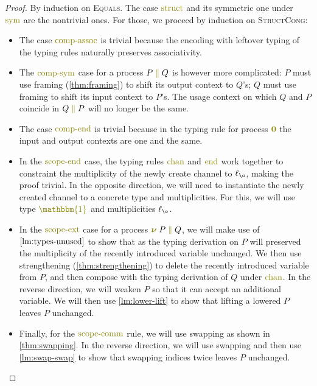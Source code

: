 \documentclass[a4paper,UKenglish,cleveref, autoref, thm-restate,authorcolumns]{lipics-v2019}
\theoremstyle{definition}
\newcommand{\constr}[1]{\textcolor{olive}{\operatorname{#1}}}
\newcommand{\PO}{\constr{\mathbf{0}}}
\newcommand{\comp}[2]{#1 \; \constr{\parallel} \; #2}
\newcommand{\new}{\constr{\boldsymbol{\nu}} \;}
\newcommand{\unit}{\constr{\mathbbm{1}}}
\newcommand{\lz}{\ell_{\o}}
\begin{document}
\begin{proof}
  By induction on \textsc{Equals}.
  The case $\constr{struct}$ and its symmetric one under $\constr{sym}$ are the nontrivial ones.
  For those, we proceed by induction on \textsc{StructCong}:
  \begin{itemize}
    \item
      The case $\constr{comp-assoc}$ is trivial because the encoding with leftover typing of the typing rules naturally preserves associativity.
    \item
      The $\constr{comp-sym}$ case for a process $\comp{P}{Q}$ is however more complicated: $P$ must use framing (\autoref{thm:framing}) to shift its output context to $Q$'s; $Q$ must use framing to shift its input context to $P$'s.
      The usage context on which $Q$ and $P$ coincide in $\comp{Q}{P}$ will no longer be the same.
    \item
      The case $\constr{comp-end}$ is trivial because in the typing rule for process $\PO$ the input and output contexts are one and the same.
    \item
      In the $\constr{scope-end}$ case, the typing rules $\constr{chan}$ and $\constr{end}$ work together to constraint the multiplicity of the newly create channel to $\lz$, making the proof trivial.
      In the opposite direction, we will need to instantiate the newly created channel to a concrete type and multiplicities.
      For this, we will use type $\unit$ and multiplicities $\lz$.
    \item
      In the $\constr{scope-ext}$ case for a process $\new \comp{P}{Q}$, we will make use of $\autoref{lm:types-unused}$ to show that as the typing derivation on $P$ will preserved the multiplicity of the recently introduced variable unchanged.
      We then use strengthening (\autoref{thm:strengthening}) to delete the recently introduced variable from $P$, and then compose with the typing derivation of $Q$ under $\constr{chan}$.
      In the reverse direction, we will weaken $P$ so that it can accept an additional variable.
      We will then use \autoref{lm:lower-lift} to show that lifting a lowered $P$ leaves $P$ unchanged.
    \item
      Finally, for the $\constr{scope-comm}$ rule, we will use swapping as shown in \autoref{thm:swapping}.
      In the reverse direction, we will use swapping and then use \autoref{lm:swap-swap} to show that swapping indices twice leaves $P$ unchanged.
  \end{itemize}
\end{proof}
\end{document}

